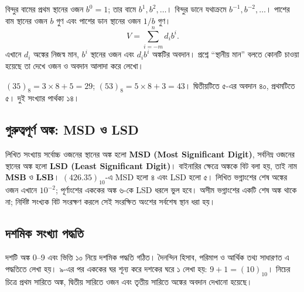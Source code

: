 বিন্দুর বামের প্রথম স্থানের ওজন $b^0=1$; তার বামে $b^1,b^2,\ldots$। বিন্দুর ডানে যথাক্রমে $b^{-1},b^{-2},\ldots$। পাশের বাম স্থানের ওজন $b$ গুণ এবং পাশের ডান স্থানের ওজন $1/b$ গুণ।
\[V=\sum_{i=-m}^{n}d_i b^i.\]
এখানে $d_i$ অঙ্কের নিজস্ব মান, $b^i$ স্থানের ওজন এবং $d_ib^i$ অঙ্কটির অবদান। প্রশ্নে ``স্থানীয় মান'' বলতে কোনটি চাওয়া হয়েছে তা দেখে ওজন ও অবদান আলাদা করে লেখো।

$(35)_8=3\times8+5=29$; $(53)_8=5\times8+3=43$। দ্বিতীয়টিতে ৫-এর অবদান ৪০, প্রথমটিতে ৫। দুই সংখ্যার পার্থক্য ১৪।

\subsection{গুরুত্বপূর্ণ অঙ্ক: MSD ও LSD}
লিখিত সংখ্যায় সর্বোচ্চ ওজনের স্থানের অঙ্ক হলো \textbf{MSD (Most Significant Digit)}, সর্বনিম্ন ওজনের স্থানের অঙ্ক হলো \textbf{LSD (Least Significant Digit)}। বাইনারির ক্ষেত্রে অঙ্ককে বিট বলা হয়, তাই নাম \textbf{MSB} ও \textbf{LSB}।
$(426.35)_{10}$-এ MSD হলো ৪ এবং LSD হলো ৫। লিখিত ভগ্নাংশের শেষ অঙ্কের ওজন এখানে $10^{-2}$; পূর্ণাংশের এককের অঙ্ক ৬-কে LSD ধরলে ভুল হবে। অসীম ভগ্নাংশের একটি শেষ অঙ্ক থাকে না; নির্দিষ্ট সংখ্যক বিট সংরক্ষণ করলে সেই সংরক্ষিত অংশের সর্বশেষ স্থান ধরা হয়।
\subsection{দশমিক সংখ্যা পদ্ধতি}
দশটি অঙ্ক 0–9 এবং ভিত্তি ১০ নিয়ে দশমিক পদ্ধতি গঠিত। দৈনন্দিন হিসাব, পরিমাপ ও আর্থিক তথ্য সাধারণত এ পদ্ধতিতে লেখা হয়। ৯-এর পর এককের ঘর শূন্য করে দশকের ঘরে ১ লেখা হয়: $9+1=(10)_{10}$।
নিচের চিত্রে প্রথম সারিতে অঙ্ক, দ্বিতীয় সারিতে ওজন এবং তৃতীয় সারিতে অঙ্কের অবদান দেখানো হয়েছে।

